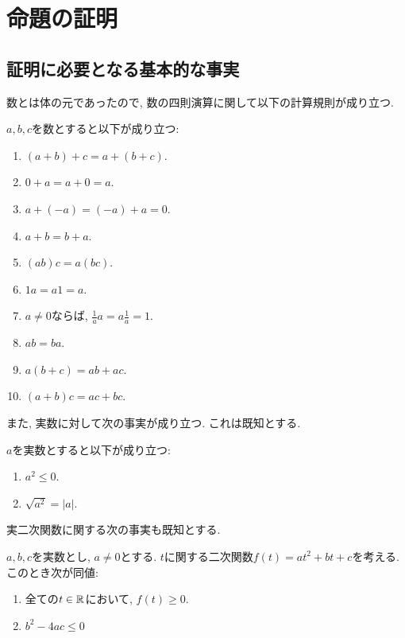 

\chapter{命題の証明}
\label{chap:proof}
\section{証明に必要となる基本的な事実}
数とは体の元であったので,
数の四則演算に関して以下の計算規則が成り立つ.
\begin{lemma}
  $a,b,c$を数とすると以下が成り立つ:
  \label{lem:numbers:field}
  \begin{enumerate}
  \item $(a+b)+c=a+(b+c)$.
  \item $0+a=a+0=a$.
  \item $a+(-a)=(-a)+a=0$.
  \item $a+b=b+a$.
  \item $(ab)c=a(bc)$.
  \item $1a=a1=a$.
  \item $a\neq 0$ならば, $\frac{1}{a}a=a\frac{1}{a}=1$.
  \item $ab=ba$.
  \item $a(b+c)=ab+ac$.
  \item $(a+b)c=ac+bc$.
  \end{enumerate}
\end{lemma}

また, 実数に対して次の事実が成り立つ.
これは既知とする.
\begin{lemma}
  $a$を実数とすると以下が成り立つ:
  \label{lem:numbers:abs}
  \begin{enumerate}
  \item $a^2\leq 0$.
  \item $\sqrt{a^2}=|a|$.
  \end{enumerate}
\end{lemma}

実二次関数に関する次の事実も既知とする.
\begin{lemma}
  \label{lem:numbers:quad}
  $a,b,c$を実数とし, $a\neq 0$とする.
  $t$に関する二次関数$f(t)=at^{2}+bt+c$を考える.
  このとき次が同値:
  \begin{enumerate}
  \item
    全ての$t\in \mathbb{R}$において, $f(t)\geq 0$.
  \item
    $b^2-4ac \leq 0$
  \end{enumerate}
\end{lemma}

